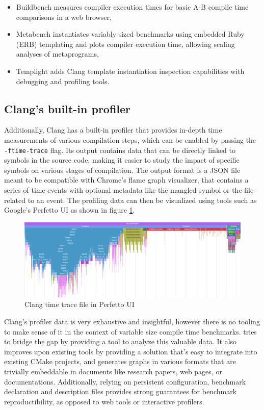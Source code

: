 \documentclass[../../main.tex]{subfiles}
\begin{document}
\begin{itemize}
\item Buildbench\cite{buildbench} measures compiler execution times for basic
      A-B compile time comparisons in a web browser,
\item Metabench\cite{metabench} instantiates variably sized benchmarks using embedded
      Ruby (ERB) templating and plots compiler execution time, allowing scaling
      analyses of metaprograms,
\item Templight\cite{templight} adds Clang template instantiation inspection
      capabilities with debugging and profiling tools.
\end{itemize}

\subsection{Clang's built-in profiler}


Additionally, Clang has a built-in profiler\cite{time-trace} that provides in-depth
time measurements of various compilation steps, which can be enabled by passing
the \lstinline{-ftime-trace} flag. Its output contains data that can be directly linked to
symbols in the source code, making it easier to study the impact of specific
symbols on various stages of compilation. The output format is a JSON file meant
to be compatible with Chrome's flame graph visualizer, that contains a series of
time events with optional metadata like the mangled \cpp symbol or the file
related to an event. The profiling data can then be visualized using tools such
as Google's Perfetto UI as shown in figure \ref{fig:perfetto-time-trace-ui}.

\begin{figure}[h]
\includegraphics[scale=0.264]{images/perfetto-ui.png}
\caption{Clang time trace file in Perfetto UI}
\label{fig:perfetto-time-trace-ui}
\end{figure}

Clang's profiler data is very exhaustive and insightful, however there is no
tooling to make sense of it in the context of variable size compile time
benchmarks. \ctbench tries to bridge the gap by providing a tool to analyze
this valuable data. It also improves upon existing tools by providing a solution
that's easy to integrate into existing CMake projects, and generates graphs in
various formats that are trivially embeddable in documents like research papers,
web pages, or documentations. Additionally, relying on persistent configuration,
benchmark declaration and description files provides strong guarantees for
benchmark reproductibility, as opposed to web tools or interactive profilers.
\end{document}
